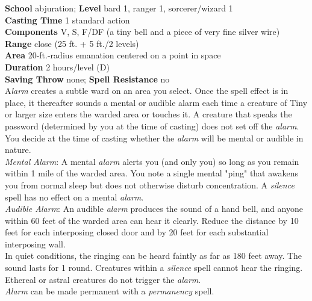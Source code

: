 \textbf{School} abjuration; \textbf{Level} bard 1, ranger 1, sorcerer/wizard 1\\
\textbf{Casting Time} 1 standard action\\
\textbf{Components} V, S, F/DF (a tiny bell and a piece of very fine silver wire)\\
\textbf{Range} close (25 ft. + 5 ft./2 levels)\\
\textbf{Area} 20-ft.-radius emanation centered on a point in space\\
\textbf{Duration} 2 hours/level (D)\\
\textbf{Saving Throw} none; \textbf{Spell Resistance} no\\
A\textit{larm }creates a subtle ward on an area you select. Once the spell effect is in place, it thereafter sounds a mental or audible alarm each time a creature of Tiny or larger size enters the warded area or touches it. A creature that speaks the password (determined by you at the time of casting) does not set off the \textit{alarm}. You decide at the time of casting whether the \textit{alarm }will be mental or audible in nature.\\
\textit{Mental Alarm}: A mental \textit{alarm }alerts you (and only you) so long as you remain within 1 mile of the warded area. You note a single mental "ping" that awakens you from normal sleep but does not otherwise disturb concentration. A \textit{silence }spell has no effect on a mental \textit{alarm}.\\
\textit{Audible Alarm}: An audible \textit{alarm }produces the sound of a hand bell, and anyone within 60 feet of the warded area can hear it clearly. Reduce the distance by 10 feet for each interposing closed door and by 20 feet for each substantial interposing wall.\\
In quiet conditions, the ringing can be heard faintly as far as 180 feet away. The sound lasts for 1 round. Creatures within a \textit{silence }spell cannot hear the ringing. \\
Ethereal or astral creatures do not trigger the \textit{alarm}.\\
\textit{Alarm }can be made permanent with a \textit{permanency }spell.\\
